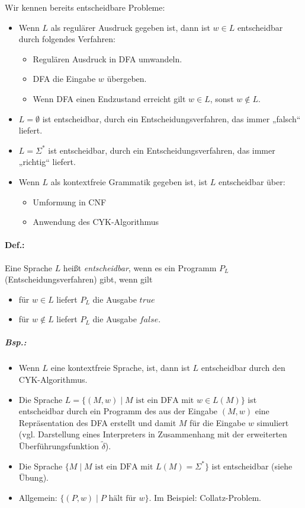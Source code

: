 Wir kennen bereits entscheidbare Probleme:
\begin{itemize}
\item Wenn $L$ als regulärer Ausdruck gegeben ist, dann ist $w\in L$ entscheidbar durch folgendes Verfahren: 
\begin{itemize}
\item Regulären Ausdruck in DFA umwandeln.
\item DFA die Eingabe $w$ übergeben.
\item Wenn DFA einen Endzustand erreicht gilt $w\in L$, sonst $w\not \in L$.
\end{itemize}
\item $L=\emptyset$ ist entscheidbar, durch ein Entscheidungsverfahren, das immer „falsch“ liefert.
\item $L=\Sigma^*$ ist entscheidbar, durch ein Entscheidungsverfahren, das immer „richtig“ liefert.
\item Wenn $L$ als kontextfreie Grammatik gegeben ist, ist $L$ entscheidbar über:
\begin{itemize}
\item Umformung in CNF
\item Anwendung des CYK-Algorithmus
\end{itemize}
\end{itemize}

\paragraph{Def.:} Eine Sprache $L$ heißt \emph{entscheidbar}, wenn es ein Programm $P_L$ (Entscheidungsverfahren) gibt, wenn gilt
\begin{itemize}
\item für $w\in L$ liefert $P_L$ die Ausgabe $true$
\item für $w \not \in L$ liefert $P_L$ die Ausgabe $false$.
\end{itemize}

\subparagraph{Bsp.:}
\begin{itemize}
\item Wenn $L$ eine kontextfreie Sprache, ist, dann ist $L$ entscheidbar durch den CYK-Algorithmus.
\item Die Sprache $L= \{ (M,w) \;|\; M \text{ ist ein DFA mit }w\in L(M)\}$ ist entscheidbar durch ein Programm des aus der Eingabe $(M,w)$ eine Repräsentation des DFA erstellt und damit $M$ für die Eingabe $w$ simuliert (vgl. Darstellung eines Interpreters in Zusammenhang mit der erweiterten Überführungsfunktion $\tilde{\delta}$).
\item Die Sprache $\{ M \;|\; M \text{ ist ein DFA mit }L(M)=\Sigma^*\}$ ist entscheidbar (siehe Übung).
\item Allgemein: $\{(P,w)\;|\;P \text{ hält für }w\}$. Im Beispiel: Collatz-Problem.
\end{itemize}
